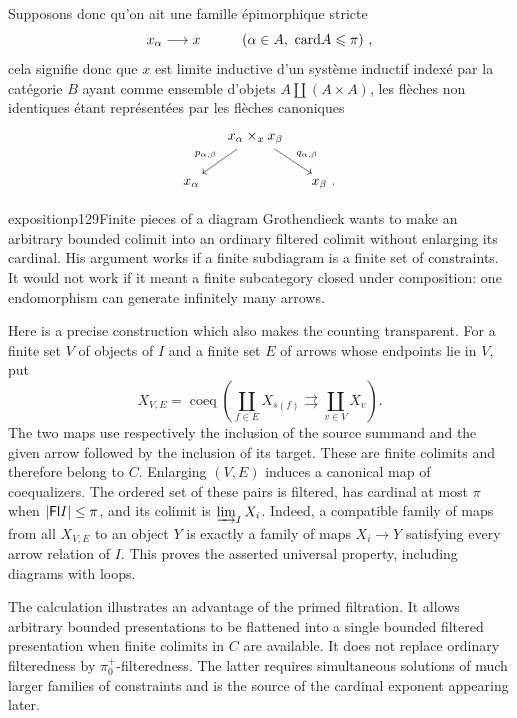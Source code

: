 Supposons donc qu'on ait une famille épimorphique stricte
\[ x_{\alpha} \longrightarrow x \qquad\quad (\alpha \in A,\ \mathrm{card} A \leqslant \pi) \ , \]
cela signifie donc que $x$ est limite inductive d'un système inductif indexé par la catégorie $B$ ayant comme ensemble d'objets $A \amalg (A\times A)$, les flèches non identiques étant représentées par les flèches canoniques
\[
\begin{tikzcd}[column sep=small]
& x_{\alpha} \times_x x_{\beta} \arrow[dl, "p_{\alpha,\beta}"'] \arrow[dr, "q_{\alpha,\beta}"] & \\
x_{\alpha} & & x_{\beta} \text{ .}
\end{tikzcd}
\]

\begin{dcomment}{exposition}{p129}{Finite pieces of a diagram}
Grothendieck wants to make an arbitrary bounded colimit into an ordinary filtered colimit without enlarging its cardinal. His argument works if a finite subdiagram is a finite set of constraints. It would not work if it meant a finite subcategory closed under composition: one endomorphism can generate infinitely many arrows.

Here is a precise construction which also makes the counting transparent. For a finite set $V$ of objects of $I$ and a finite set $E$ of arrows whose endpoints lie in $V$, put
\[
 X_{V,E}=\operatorname{coeq}\left(
 \coprod_{f\in E}X_{s(f)}\rightrightarrows
 \coprod_{v\in V}X_v\right).
\]
The two maps use respectively the inclusion of the source summand and the given arrow followed by the inclusion of its target. These are finite colimits and therefore belong to $C$. Enlarging $(V,E)$ induces a canonical map of coequalizers. The ordered set of these pairs is filtered, has cardinal at most $\pi$ when $|\mathsf{Fl} I|\leq\pi$, and its colimit is $\varinjlim_I X_i$. Indeed, a compatible family of maps from all $X_{V,E}$ to an object $Y$ is exactly a family of maps $X_i\to Y$ satisfying every arrow relation of $I$. This proves the asserted universal property, including diagrams with loops.

The calculation illustrates an advantage of the primed filtration. It allows arbitrary bounded presentations to be flattened into a single bounded filtered presentation when finite colimits in $C$ are available. It does not replace ordinary filteredness by $\pi_0^+$-filteredness. The latter requires simultaneous solutions of much larger families of constraints and is the source of the cardinal exponent appearing later.
\end{dcomment}


